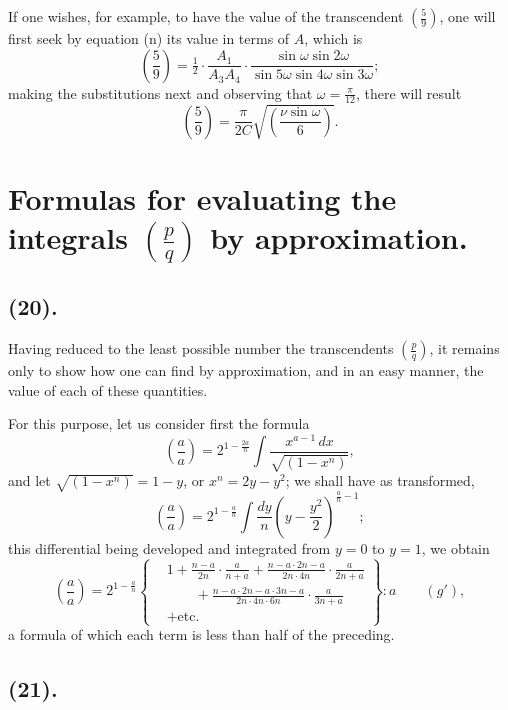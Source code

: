 \documentclass{article}
\begin{document}
If one wishes, for example, to have the value of the transcendent $\left(\frac{5}{9}\right)$, one will first seek by equation (n) its value in terms of $A$, which is
\[ \left(\frac{5}{9}\right)=\tfrac{1}{2}\cdot\frac{A_{1}}{A_{3}A_{4}}\cdot\frac{\sin\omega\sin 2\omega}{\sin 5\omega\sin 4\omega\sin 3\omega}; \]
making the substitutions next and observing that $\omega=\frac{\pi}{12}$, there will result
\[ \left(\frac{5}{9}\right)=\frac{\pi}{2C}\sqrt{\left(\frac{\nu\sin\omega}{6}\right)}. \]


\section*{Formulas for evaluating the integrals $\left(\frac{p}{q}\right)$ by approximation.}

\subsection*{(20).}

Having reduced to the least possible number the transcendents $\left(\frac{p}{q}\right)$, it remains only to show how one can find by approximation, and in an easy manner, the value of each of these quantities.

For this purpose, let us consider first the formula
\[ \left(\frac{a}{a}\right)=2^{1-\frac{2a}{n}}\int\frac{x^{a-1}\,dx}{\sqrt{(1-x^{n})}}, \]
and let $\sqrt{(1-x^{n})}=1-y$, or $x^{n}=2y-y^{2}$; we shall have as transformed,
\[ \left(\frac{a}{a}\right)=2^{1-\frac{a}{n}}\int\frac{dy}{n}\left(y-\frac{y^{2}}{2}\right)^{\frac{a}{n}-1}; \]
this differential being developed and integrated from $y=0$ to $y=1$, we obtain
\[ \left(\frac{a}{a}\right)=2^{1-\frac{a}{n}}\left\{\begin{aligned} &1+\frac{n-a}{2n}\cdot\frac{a}{n+a}+\frac{n-a\cdot 2n-a}{2n\cdot 4n}\cdot\frac{a}{2n+a}\\ &\qquad+\frac{n-a\cdot 2n-a\cdot 3n-a}{2n\cdot 4n\cdot 6n}\cdot\frac{a}{3n+a}\\ &+\text{etc.} \end{aligned}\right\}:a\qquad(g'), \]
a formula of which each term is less than half of the preceding.

\subsection*{(21).}
\end{document}
